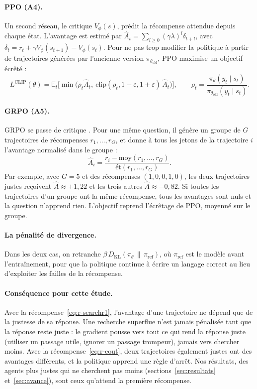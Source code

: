 \documentclass[11pt,a4paper]{article}
\begin{document}
\paragraph{PPO (A4).} Un second réseau, le critique $V_\phi(s)$, prédit la récompense attendue depuis chaque état. L'avantage est estimé par $\hat{A}_t = \sum_{l \ge 0} (\gamma\lambda)^l \delta_{t+l}$, avec $\delta_t = r_t + \gamma V_\phi(s_{t+1}) - V_\phi(s_t)$. Pour ne pas trop modifier la politique à partir de trajectoires générées par l'ancienne version $\pi_{\theta_\text{old}}$, PPO maximise un objectif écrêté \citep{schulman2017proximal} :
\begin{equation}
L^{\text{CLIP}}(\theta) = \mathbb{E}_t\Big[\min\big(\rho_t \hat{A}_t,\ \mathrm{clip}(\rho_t, 1-\varepsilon, 1+\varepsilon)\,\hat{A}_t\big)\Big], \qquad \rho_t = \frac{\pi_\theta(y_t \mid s_t)}{\pi_{\theta_\text{old}}(y_t \mid s_t)}.
\end{equation}

\paragraph{GRPO (A5).} GRPO se passe de critique \citep{shao2024deepseekmath}. Pour une même question, il génère un groupe de $G$ trajectoires de récompenses $r_1, \dots, r_G$, et donne à tous les jetons de la trajectoire $i$ l'avantage normalisé dans le groupe :
\begin{equation}
\hat{A}_i = \frac{r_i - \mathrm{moy}(r_1, \dots, r_G)}{\mathrm{ét}(r_1, \dots, r_G)}.
\end{equation}
Par exemple, avec $G = 5$ et des récompenses $(1, 0, 0, 1, 0)$, les deux trajectoires justes reçoivent $\hat{A} \approx +1{,}22$ et les trois autres $\hat{A} \approx -0{,}82$. Si toutes les trajectoires d'un groupe ont la même récompense, tous les avantages sont nuls et la question n'apprend rien. L'objectif reprend l'écrêtage de PPO, moyenné sur le groupe.

\paragraph{La pénalité de divergence.} Dans les deux cas, on retranche $\beta\, D_{\mathrm{KL}}(\pi_\theta \,\|\, \pi_\text{ref})$, où $\pi_\text{ref}$ est le modèle avant l'entraînement, pour que la politique continue à écrire un langage correct au lieu d'exploiter les failles de la récompense.

\paragraph{Conséquence pour cette étude.} Avec la récompense~\eqref{eq:r-searchr1}, l'avantage d'une trajectoire ne dépend que de la justesse de sa réponse. Une recherche superflue n'est jamais pénalisée tant que la réponse reste juste : le gradient pousse vers tout ce qui rend la réponse juste (utiliser un passage utile, ignorer un passage trompeur), jamais vers chercher moins. Avec la récompense~\eqref{eq:r-cout}, deux trajectoires également justes ont des avantages différents, et la politique apprend une règle d'arrêt. Nos résultats, des agents plus justes qui ne cherchent pas moins (sections~\ref{sec:resultats} et~\ref{sec:avance}), sont ceux qu'attend la première récompense.
\end{document}

